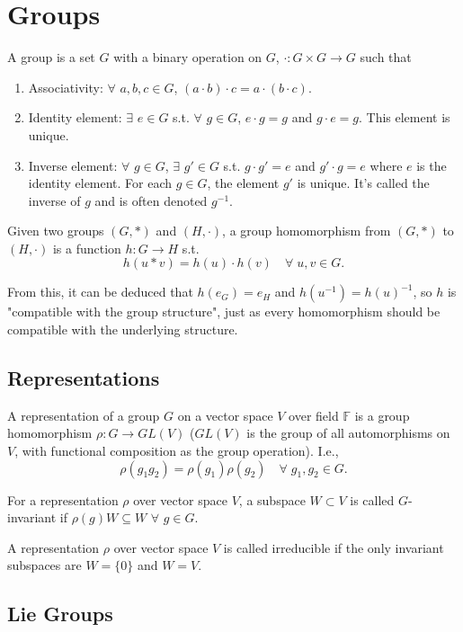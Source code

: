 \chapter{Groups}
\begin{definition}[Group]
	A group is a set $G$ with a binary operation on $G$, $\cdot: G\times G\rightarrow G$ such that
	\begin{enumerate}
		\item Associativity: $\forall$ $a, b, c\in G$, $(a\cdot b)\cdot c = a\cdot(b\cdot c).$
		\item Identity element: $\exists$ $e\in G$ s.t. $\forall$ $g \in G$, $e\cdot g=g$ and $g\cdot e=g$. This element is unique.
		\item Inverse element: $\forall$ $g\in G$, $\exists$ $g'\in G$ s.t. $g\cdot g'=e$ and $g'\cdot g=e$ where $e$ is the identity element. For each $g\in G$, the element $g'$ is unique. It's called the inverse of $g$ and is often denoted $g^{-1}$.
	\end{enumerate} 
\end{definition}
\begin{definition}
	Given two groups $(G, *)$ and $(H, \cdot)$, a group homomorphism from $(G, *)$ to $(H, \cdot)$ is a function $h: G\rightarrow H$ s.t.
	$$
		h(u*v) = h(u)\cdot h(v) \quad \forall \; u, v\in G.
	$$
\end{definition}
From this, it can be deduced that $h(e_G)=e_H$ and $h(u^{-1})=h(u)^{-1}$, so $h$ is "compatible with the group structure", just as every homomorphism should be compatible with the underlying structure.
\section{Representations}
\begin{definition}[Representation]
	A representation of a group $G$ on a vector space $V$ over field $\mathbb{F}$ is a group homomorphism $\rho: G\rightarrow GL(V)$ ($GL(V)$ is the group of all automorphisms on $V$, with functional composition as the group operation). I.e.,
	$$
		\rho(g_1g_2)=\rho(g_1)\rho(g_2) \quad \forall\; g_1, g_2\in G.
	$$
\end{definition}
For a representation $\rho$ over vector space $V$, a subspace $W\subset V$ is called $G$-invariant if $\rho(g)W\subseteq W$ $\forall$ $g\in G$.
\begin{definition}
	A representation $\rho$ over vector space $V$ is called irreducible if the only invariant subspaces are $W=\{0\}$ and $W=V$.
\end{definition}
\section{Lie Groups}